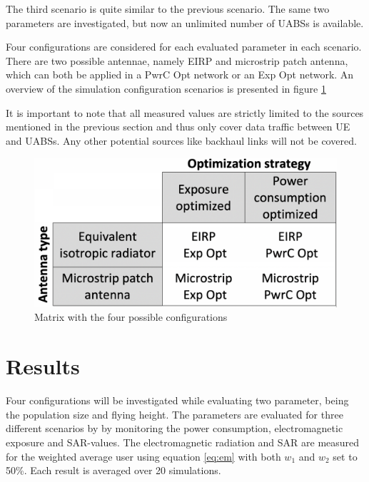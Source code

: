\documentclass[twocolumn]{phdsymp} %
\begin{document}
The third scenario is quite similar to the previous scenario. The same two parameters
 are investigated, but now an unlimited number of \gls{UABS}s is available.

Four configurations are considered for each evaluated parameter in each scenario.
There are two possible antennae, namely EIRP 
and microstrip patch antenna, which can both be applied in a \gls{PwrC Opt} network or an \gls{Exp Opt} network.
An overview of the simulation configuration scenarios is presented in figure \ref{fig:fourCasesMatrix}

It is important to note that 
all measured values are strictly limited to the sources mentioned in the previous section and thus only cover data traffic 
between \gls{UE} and \gls{UABS}s. Any other potential sources like backhaul links will not be covered.

\begin{figure}[h!]
\centering
  \includegraphics[width=0.7\linewidth]{fourCasesMatrix.png}
  \caption{Matrix with the four possible configurations}
  \label{fig:fourCasesMatrix}
\end{figure}


\section{Results}
Four configurations will be investigated while evaluating two parameter, being the population size and flying height.
The parameters are evaluated for three different scenarios by by monitoring the power consumption, electromagnetic exposure and \gls{SAR}-values.
The electromagnetic radiation and \gls{SAR} are 
measured for the weighted average user using 
equation \ref{eq:em} with both $w_{1}$ and $w_{2}$ set to 50\%. Each result is averaged over 20 simulations. 
\end{document}
